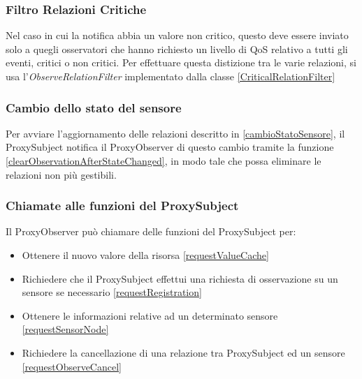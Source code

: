 			\subsubsection{Filtro Relazioni Critiche}
				Nel caso in cui la notifica abbia un valore non critico, questo deve essere inviato solo a quegli osservatori che hanno richiesto un livello di QoS relativo a tutti gli eventi, critici o non critici. Per effettuare questa distizione tra le varie relazioni, si usa l'\textit{ObserveRelationFilter} implementato dalla classe \ref{CriticalRelationFilter}
				

			\subsubsection{Cambio dello stato del sensore}
				Per avviare l'aggiornamento delle relazioni descritto in \ref{cambioStatoSensore}, il ProxySubject notifica il ProxyObserver di questo cambio tramite la funzione \ref{clearObservationAfterStateChanged}, in modo tale che possa eliminare le relazioni non più gestibili.
				

			\subsubsection{Chiamate alle funzioni del ProxySubject}
				Il ProxyObserver può chiamare delle funzioni del ProxySubject per:
				\begin{itemize}
					\item Ottenere il nuovo valore della risorsa \ref{requestValueCache}
					\item Richiedere che il ProxySubject effettui una richiesta di osservazione su un sensore se necessario \ref{requestRegistration}
					\item Ottenere le informazioni relative ad un determinato sensore \ref{requestSensorNode}
					\item Richiedere la cancellazione di una relazione tra ProxySubject ed un sensore \ref{requestObserveCancel}
				\end{itemize}

				
				
				
				
				
